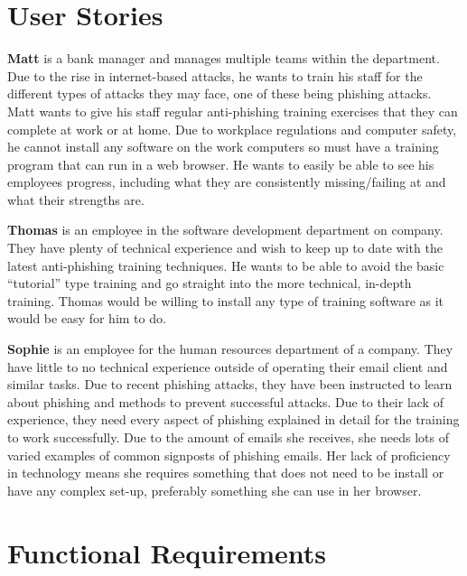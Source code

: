 \documentclass{l4proj}
\begin{document}
\section{User Stories}
\textbf{Matt} is a bank manager and manages multiple teams within the department. Due to the rise in internet-based attacks, he wants to train his staff for the different types of attacks they may face, one of these being phishing attacks. Matt wants to give his staff regular anti-phishing training exercises that they can complete at work or at home. Due to workplace regulations and computer safety, he cannot install any software on the work computers so must have a training program that can run in a web browser. He wants to easily be able to see his employees progress, including what they are consistently missing/failing at and what their strengths are. 

\textbf{Thomas} is an employee in the software development department on company. They have plenty of technical experience and wish to keep up to date with the latest anti-phishing training techniques. He wants to be able to avoid the basic “tutorial” type training and go straight into the more technical, in-depth training. Thomas would be willing to install any type of training software as it would be easy for him to do. 

\textbf{Sophie} is an employee for the human resources department of a company. They have little to no technical experience outside of operating their email client and similar tasks. Due to recent phishing attacks, they have been instructed to learn about phishing and methods to prevent successful attacks. Due to their lack of experience, they need every aspect of phishing explained in detail for the training to work successfully. Due to the amount of emails she receives, she needs lots of varied examples of common signposts of phishing emails. Her lack of proficiency in technology means she requires something that does not need to be install or have any complex set-up, preferably something she can use in her browser.

\section{Functional Requirements}
\end{document}
